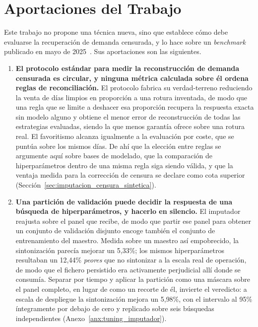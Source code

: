 \section{Aportaciones del Trabajo}
\label{sec:aportaciones}
Este trabajo no propone una técnica nueva, sino que establece cómo debe evaluarse la
recuperación de demanda censurada, y lo hace sobre un \textit{benchmark} publicado en mayo de
2025~\cite{freshretailnet2025}. Sus aportaciones son las siguientes.

\begin{enumerate}
    \item \textbf{El protocolo estándar para medir la reconstrucción de demanda censurada es
    circular, y ninguna métrica calculada sobre él ordena reglas de reconciliación.} El protocolo
    fabrica su verdad-terreno reduciendo la venta de días limpios en proporción a una rotura
    inventada, de modo que una regla que se limite a deshacer esa proporción recupera la
    respuesta exacta sin modelo alguno y obtiene el menor error de reconstrucción de todas las
    estrategias evaluadas, siendo la que menos garantía ofrece sobre una rotura real. El
    favoritismo alcanza igualmente a la evaluación por coste, que se puntúa sobre los mismos días.
    De ahí que la elección entre reglas se argumente aquí sobre bases de modelado, que la
    comparación de hiperparámetros dentro de una misma regla siga siendo válida, y que la ventaja
    medida para la corrección de censura se declare como cota superior
    (Sección~\ref{sec:imputacion_censura_sintetica}).

    \item \textbf{Una partición de validación puede decidir la respuesta de una búsqueda de
    hiperparámetros, y hacerlo en silencio.} El imputador reajusta sobre el panel que recibe, de
    modo que partir ese panel para obtener un conjunto de validación disjunto encoge también el
    conjunto de entrenamiento del maestro. Medida sobre un maestro así empobrecido, la
    sintonización parecía mejorar un 5{,}33\%; los mismos hiperparámetros resultaban un 12{,}44\%
    \emph{peores} que no sintonizar a la escala real de operación, de modo que el fichero
    persistido era activamente perjudicial allí donde se consumía. Separar por tiempo y aplicar la
    partición como una máscara sobre el panel completo, en lugar de como un recorte de él,
    invierte el veredicto: a escala de despliegue la sintonización mejora un 5{,}98\%, con el
    intervalo al 95\% íntegramente por debajo de cero y replicado sobre seis búsquedas
    independientes (Anexo~\ref{anx:tuning_imputador}).


\end{enumerate}
